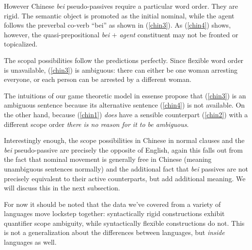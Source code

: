 \documentclass{article}
\begin{document}
However Chinese \emph{bei} pseudo-passives require a particular word order.
They are rigid.
The semantic object is promoted as the initial nominal, while the agent follows the preverbal co-verb ``bei'' as shown in (\ref{chin3}). As (\ref{chin4}) shows, however, the quasi-prepositional \emph{bei} $+$ \emph{agent} constituent may not be fronted or topicalized.

\begin{exe}
\end{exe}

The scopal possibilities follow the predictions perfectly. Since flexible word order is unavailable, (\ref{chin3}) is ambiguous: there can either be one woman arresting everyone, or each person can be arrested by a different woman.

The intuitions of our game theoretic model in essense propose that (\ref{chin3}) is an ambiguous sentence because its alternative sentence (\ref{chin4}) is not available.
On the other hand, because (\ref{chin1}) \emph{does} have a sensible counterpart (\ref{chin2}) with a different scope order \emph{there is no reason for it to be ambiguous}.

Interestingly enough, the scope possibilities in Chinese in normal clauses and the \emph{bei} pseudo-passive are precisely the opposite of English, again this falls out from the fact that nominal movement is generally free in Chinese (meaning unambiguous sentences normally) and the additional fact that \emph{bei} passives are not precisely equivalent to their active counterparts, but add additional meaning.
We will discuss this in the next subsection.

For now it should be noted that the data we've covered from a variety of languages move lockstep together: syntactically rigid constructions exhibit quantifier scope ambiguity, while syntactically flexible constructions do not.
This is not a generalization about the differences between languages, but \emph{inside} languages as well.
\end{document}
